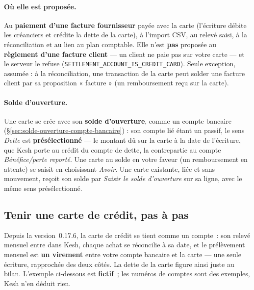 \documentclass[a4paper,11pt,oneside]{article}
\begin{document}
\paragraph{Où elle est proposée.} Au \textbf{paiement d'une facture fournisseur} payée avec la carte (l'écriture débite les créanciers et crédite la dette de la carte), à l'import CSV, au relevé saisi, à la réconciliation et au lien au plan comptable. Elle n'est \textbf{pas} proposée au \textbf{règlement d'une facture client} --- un client ne paie pas sur votre carte --- et le serveur le refuse (\texttt{SETTLEMENT\_ACCOUNT\_\allowbreak IS\_CREDIT\_CARD}). Seule exception, assumée : à la réconciliation, une transaction de la carte peut solder une facture client par sa proposition « facture » (un remboursement reçu sur la carte).

\paragraph{Solde d'ouverture.} Une carte se crée avec son \textbf{solde d'ouverture}, comme un compte bancaire (\S\ref{sec:solde-ouverture-compte-bancaire}) : son compte lié étant un passif, le sens \emph{Dette} est \textbf{présélectionné} --- le montant dû sur la carte à la date de l'écriture, que Kesh porte au crédit du compte de dette, la contrepartie au compte \emph{Bénéfice/perte reporté}. Une carte au solde en votre faveur (un remboursement en attente) se saisit en choisissant \emph{Avoir}. Une carte existante, liée et sans mouvement, reçoit son solde par \emph{Saisir le solde d'ouverture} sur sa ligne, avec le même sens présélectionné.

\subsection{Tenir une carte de crédit, pas à pas}\label{sec:tenir-carte}

Depuis la version~0.17.6, la carte de crédit se tient comme un compte~: son relevé mensuel entre dans Kesh, chaque achat se réconcilie à sa date, et le prélèvement mensuel est \textbf{un virement} entre votre compte bancaire et la carte --- une seule écriture, rapprochée des deux côtés. La dette de la carte figure ainsi juste au bilan. L'exemple ci-dessous est \textbf{fictif}~; les numéros de comptes sont des exemples, Kesh n'en déduit rien.
\end{document}

